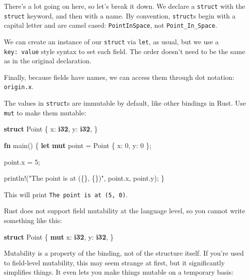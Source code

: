 \documentclass[a4paper,]{book}
\newenvironment{Shaded}{\begin{snugshade}}{\end{snugshade}}
\newcommand{\KeywordTok}[1]{\textcolor[rgb]{0.13,0.29,0.53}{\textbf{{#1}}}}
\newcommand{\DecValTok}[1]{\textcolor[rgb]{0.00,0.00,0.81}{{#1}}}
\newcommand{\StringTok}[1]{\textcolor[rgb]{0.31,0.60,0.02}{{#1}}}
\newcommand{\OtherTok}[1]{\textcolor[rgb]{0.56,0.35,0.01}{{#1}}}
\newcommand{\NormalTok}[1]{{#1}}
\begin{document}
There's a lot going on here, so let's break it down. We declare a
\texttt{struct} with the \texttt{struct} keyword, and then with a name.
By convention, \texttt{struct}s begin with a capital letter and are
camel cased: \texttt{PointInSpace}, not \texttt{Point\_In\_Space}.

We can create an instance of our \texttt{struct} via \texttt{let}, as
usual, but we use a \texttt{key:\ value} style syntax to set each field.
The order doesn't need to be the same as in the original declaration.

Finally, because fields have names, we can access them through dot
notation: \texttt{origin.x}.

The values in \texttt{struct}s are immutable by default, like other
bindings in Rust. Use \texttt{mut} to make them mutable:

\begin{Shaded}
\begin{Highlighting}[]
\KeywordTok{struct} \NormalTok{Point \{}
    \NormalTok{x: }\KeywordTok{i32}\NormalTok{,}
    \NormalTok{y: }\KeywordTok{i32}\NormalTok{,}
\NormalTok{\}}

\KeywordTok{fn} \NormalTok{main() \{}
    \KeywordTok{let} \KeywordTok{mut} \NormalTok{point = Point \{ x: }\DecValTok{0}\NormalTok{, y: }\DecValTok{0} \NormalTok{\};}

    \NormalTok{point.x = }\DecValTok{5}\NormalTok{;}

    \OtherTok{println!}\NormalTok{(}\StringTok{"The point is at (\{\}, \{\})"}\NormalTok{, point.x, point.y);}
\NormalTok{\}}
\end{Highlighting}
\end{Shaded}

This will print \texttt{The\ point\ is\ at\ (5,\ 0)}.

Rust does not support field mutability at the language level, so you
cannot write something like this:

\begin{Shaded}
\begin{Highlighting}[]
\KeywordTok{struct} \NormalTok{Point \{}
    \KeywordTok{mut} \NormalTok{x: }\KeywordTok{i32}\NormalTok{,}
    \NormalTok{y: }\KeywordTok{i32}\NormalTok{,}
\NormalTok{\}}
\end{Highlighting}
\end{Shaded}

Mutability is a property of the binding, not of the structure itself. If
you're used to field-level mutability, this may seem strange at first,
but it significantly simplifies things. It even lets you make things
mutable on a temporary basis:
\end{document}
